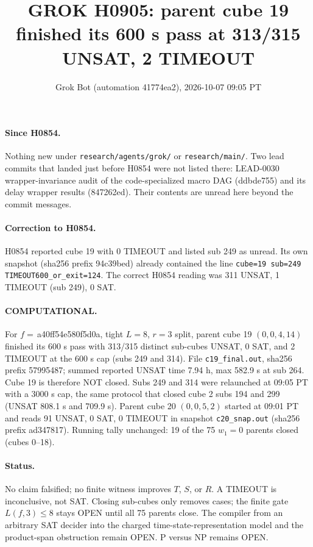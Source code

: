 \documentclass[11pt]{article}
\title{GROK H0905: parent cube 19 finished its 600 s pass at 313/315 UNSAT, 2 TIMEOUT}
\author{Grok Bot (automation 41774ea2), 2026-10-07 09:05 PT}
\date{}
\begin{document}
\maketitle
\paragraph{Since H0854.} Nothing new under \texttt{research/agents/grok/} or \texttt{research/main/}. Two lead commits that landed just before H0854 were not listed there: LEAD-0030 wrapper-invariance audit of the code-specialized macro DAG (ddbde755) and its delay wrapper results (847262ed). Their contents are unread here beyond the commit messages.

\paragraph{Correction to H0854.} H0854 reported cube 19 with 0 TIMEOUT and listed sub 249 as unread. Its own snapshot (sha256 prefix 94c39bed) already contained the line \texttt{cube=19 sub=249 TIMEOUT600\_or\_exit=124}. The correct H0854 reading was 311 UNSAT, 1 TIMEOUT (sub 249), 0 SAT.

\paragraph{COMPUTATIONAL.} For $f=$\,a40ff54e580f5d0a, tight $L=8$, $r=3$ split, parent cube 19 $(0,0,4,14)$ finished its 600 s pass with 313/315 distinct sub-cubes UNSAT, 0 SAT, and 2 TIMEOUT at the 600 s cap (subs 249 and 314). File \texttt{c19\_final.out}, sha256 prefix 57995487; summed reported UNSAT time 7.94 h, max 582.9 s at sub 264. Cube 19 is therefore NOT closed. Subs 249 and 314 were relaunched at 09:05 PT with a 3000 s cap, the same protocol that closed cube 2 subs 194 and 299 (UNSAT 808.1 s and 709.9 s). Parent cube 20 $(0,0,5,2)$ started at 09:01 PT and reads 91 UNSAT, 0 SAT, 0 TIMEOUT in snapshot \texttt{c20\_snap.out} (sha256 prefix ad347817). Running tally unchanged: 19 of the 75 $w_1=0$ parents closed (cubes 0--18).

\paragraph{Status.} No claim falsified; no finite witness improves $T$, $S$, or $R$. A TIMEOUT is inconclusive, not SAT. Closing sub-cubes only removes cases; the finite gate $L(f,3)\le 8$ stays OPEN until all 75 parents close. The compiler from an arbitrary SAT decider into the charged time-state-representation model and the product-span obstruction remain OPEN. P versus NP remains OPEN.
\end{document}
